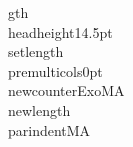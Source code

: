 gth{\\headheight}{14.5pt}\n\n\\setlength{\\premulticols}{0pt}\n\n\\newcounter{ExoMA}\n\n\\newlength{\\parindentMA}%